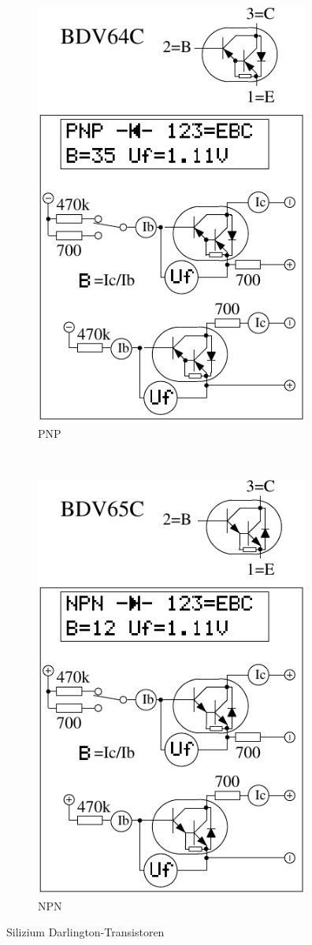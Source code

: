 \begin{figure}[H]
  \begin{subfigure}[b]{9cm}
    \centering
    \includegraphics[width=9cm]{../FIG/BJT_BDV64.pdf}
    \caption{PNP}
    \label{fig:BJT-PNP-Darl-R-D}
  \end{subfigure}
  ~
  \begin{subfigure}[b]{9cm}
    \centering
    \includegraphics[width=9cm]{../FIG/BJT_BDV65.pdf}
    \caption{NPN}
    \label{fig:BJT-NPN-Darl-R-D}
  \end{subfigure}
  \caption{Silizium Darlington-Transistoren}
\end{figure}
